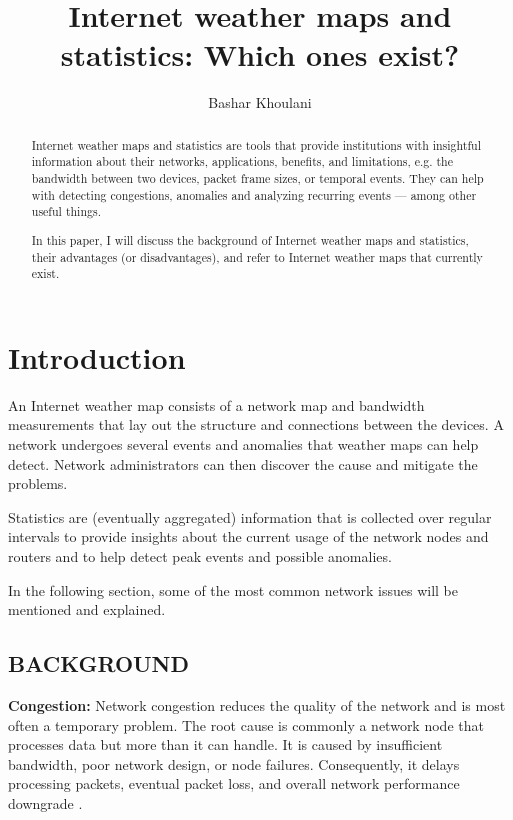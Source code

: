 \documentclass[sigconf,authorversion,nonacm]{acmart}
\begin{document}

\title{Internet weather maps and statistics: Which ones exist?}

\author{Bashar Khoulani}

\begin{abstract}
Internet weather maps and statistics are tools that provide institutions with insightful information about their networks, applications, benefits, and limitations, e.g. the bandwidth between two devices, packet frame sizes, or temporal events. They can help with detecting congestions, anomalies and analyzing recurring events --- among other useful things. 

In this paper, I will discuss the background of Internet weather maps and statistics, their advantages (or disadvantages), and refer to Internet weather maps that currently exist.
\end{abstract}
\maketitle
\section{Introduction}
An Internet weather map consists of a network map and bandwidth measurements that lay out the structure and connections between the devices. A network undergoes several events and anomalies that weather maps can help detect. Network administrators can then discover the cause and mitigate the problems.

Statistics are (eventually aggregated) information that is collected over regular intervals to provide insights about the current usage of the network nodes and routers and to help detect peak events and possible anomalies. 

In the following section, some of the most common network issues will be mentioned and explained. 
\subsection{BACKGROUND}
\textbf{Congestion:} Network congestion reduces the quality of the network and is most often a temporary problem. The root cause is commonly a network node that processes data but more than it can handle. It is caused by insufficient bandwidth, poor network design, or node failures. Consequently, it delays processing packets, eventual packet loss, and overall network performance downgrade \cite{simulation}.
\end{document}
